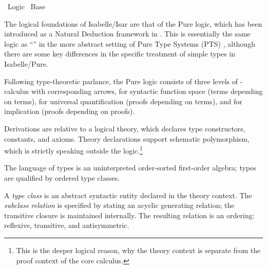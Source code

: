 %
\begin{isabellebody}%
\def\isabellecontext{Logic}%
%
\isadelimtheory
%
\endisadelimtheory
%
\isatagtheory
{}\isamarkupfalse%
\ Logic\isanewline
{}\ Base\isanewline
{}%
\endisatagtheory
{\isafoldtheory}%
%
\isadelimtheory
%
\endisadelimtheory
%
\isamarkuptrue%
%
\begin{isamarkuptext}%
The logical foundations of Isabelle/Isar are that of the Pure logic,
  which has been introduced as a Natural Deduction framework in
  \cite{paulson700}.  This is essentially the same logic as ``'' in the more abstract setting of Pure Type Systems (PTS)
  \cite{Barendregt-Geuvers:2001}, although there are some key
  differences in the specific treatment of simple types in
  Isabelle/Pure.

  Following type-theoretic parlance, the Pure logic consists of three
  levels of \isa{{\isasymlambda}}-calculus with corresponding arrows, \isa{{\isasymRightarrow}} for syntactic function space (terms depending on terms), \isa{{\isasymAnd}} for universal quantification (proofs depending on terms), and
  \isa{{\isasymLongrightarrow}} for implication (proofs depending on proofs).

  Derivations are relative to a logical theory, which declares type
  constructors, constants, and axioms.  Theory declarations support
  schematic polymorphism, which is strictly speaking outside the
  logic.\footnote{This is the deeper logical reason, why the theory
  context \isa{{\isasymTheta}} is separate from the proof context \isa{{\isasymGamma}}
  of the core calculus.}%
\end{isamarkuptext}%
\isamarkuptrue%
%
\isamarkuptrue%
%
\begin{isamarkuptext}%
The language of types is an uninterpreted order-sorted first-order
  algebra; types are qualified by ordered type classes.

  \medskip A \emph{type class} is an abstract syntactic entity
  declared in the theory context.  The \emph{subclass relation}  is specified by stating an acyclic
  generating relation; the transitive closure is maintained
  internally.  The resulting relation is an ordering: reflexive,
  transitive, and antisymmetric.


\end{isamarkuptext}
\end{isabellebody}
